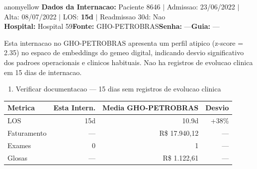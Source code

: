 \documentclass[a4paper,10pt]{article}
\begin{document}
\begin{anomalycard}[Internacao 8760 | GHO-PETROBRAS | MODERADO (z=2.35)]{anomyellow}
\textbf{Dados da Internacao:} Paciente 8646 $\mid$ Admissao: 23/06/2022 $\mid$ Alta: 08/07/2022 $\mid$ LOS: \textbf{15d} $\mid$ Readmissao 30d: Nao\\
\textbf{Hospital:} Hospital 59\quad\textbf{Fonte:} GHO-PETROBRAS\quad\textbf{Senha:} ---\quad\textbf{Guia:} ---\\
\vspace{2pt}\begin{tcolorbox}[colback=severityred!20,colframe=anomyellow,title={\textbf{Interpretacao de Negocio}},fonttitle=\bfseries\small,left=4pt,right=4pt,top=3pt,bottom=3pt]
{\small Esta internacao no GHO-PETROBRAS apresenta um perfil atipico (z-score = 2.35) no espaco de embeddings do gemeo digital, indicando desvio significativo dos padroes operacionais e clinicos habituais. Nao ha registros de evolucao clinica em 15 dias de internacao.}
\end{tcolorbox}
\begin{tcolorbox}[colback=severityyellow!30,colframe=anomorange,title={\textbf{Recomendacoes Especificas}},fonttitle=\bfseries\small,left=4pt,right=4pt,top=3pt,bottom=3pt]
\begin{enumerate}[nosep,leftmargin=16pt]
\item {\small Verificar documentacao --- 15 dias sem registros de evolucao clinica}
\end{enumerate}
\end{tcolorbox}
\begin{center}\begin{tabular}{l r r r}\toprule\textbf{Metrica} & \textbf{Esta Intern.} & \textbf{Media GHO-PETROBRAS} & \textbf{Desvio} \\\midrule
LOS & 15d & 10.9d & +38\% \\
Faturamento & --- & R\$ 17.940,12 & --- \\
Exames & 0 & 1 & --- \\
Glosas & --- & R\$ 1.122,61 & --- \\
\bottomrule\end{tabular}\end{center}


\end{anomalycard}
\end{document}
